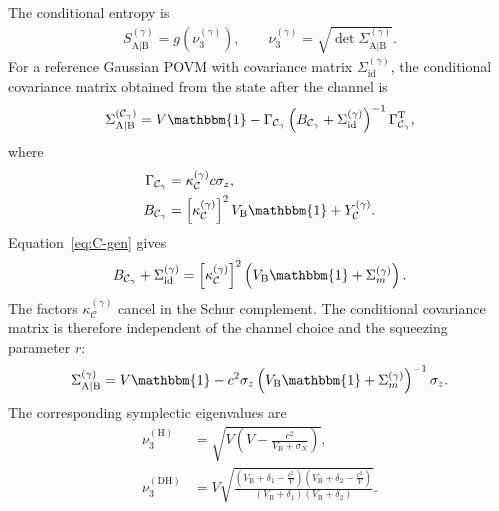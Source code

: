 \documentclass[%
final, 
superscriptaddress,
 amsmath,amssymb,amsfonts,
 aps,
 pra,
 longbibliography,
]{revtex4-2}
\newcommand{\ind}[1]{\mathrm{#1}}
\begin{document}
The conditional entropy is
\begin{align}
  \label{eq:S_A1B-gamma}
  S_{\ind{A|B}}^{(\gamma)}
  =
  g(\nu_3^{(\gamma)}),
  \qquad
  \nu_3^{(\gamma)}
  =
  \sqrt{\det\Sigma_{\ind{A|B}}^{(\gamma)}}.
\end{align}
For a reference Gaussian POVM with covariance matrix
$\Sigma_{\ind{id}}^{(\gamma)}$, the conditional covariance matrix obtained from the state after the channel is
\begin{align}
  \Sigma_{\ind{A|B}}^{(\mathcal{C}_{\gamma})}
  =
  V\mathbbm{1}
  -
  \Gamma_{\mathcal{C}_{\gamma}}
  \left(
    B_{\mathcal{C}_{\gamma}}
    +
    \Sigma_{\ind{id}}^{(\gamma)}
  \right)^{-1}
  \Gamma_{\mathcal{C}_{\gamma}}^{\ind{T}},
\end{align}
where
\begin{align}
  \Gamma_{\mathcal{C}_{\gamma}}
  &=
  \kappa_{\mathcal{C}}^{(\gamma)}
  c\sigma_z,
  \\
  B_{\mathcal{C}_{\gamma}}
  &=
  \left[
    \kappa_{\mathcal{C}}^{(\gamma)}
  \right]^2
  V_{\ind{B}}\mathbbm{1}
  +
  Y_{\mathcal{C}}^{(\gamma)}.
\end{align}
Equation~\eqref{eq:C-gen} gives
\begin{align}
  B_{\mathcal{C}_{\gamma}}
  +
  \Sigma_{\ind{id}}^{(\gamma)}
  =
  \left[
    \kappa_{\mathcal{C}}^{(\gamma)}
  \right]^2
  \left(
    V_{\ind{B}}\mathbbm{1}
    +
    \Sigma_m^{(\gamma)}
  \right).
\end{align}
The factors
$\kappa_{\mathcal{C}}^{(\gamma)}$
cancel in the Schur complement. The conditional covariance matrix is therefore independent of the channel choice and the squeezing parameter $r$:
\begin{align}
  \label{eq:serf-a|b}
  \Sigma_{\ind{A|B}}^{(\gamma)}
  =
  V\mathbbm{1}
  -
  c^2\sigma_z
  \left(
    V_{\ind{B}}\mathbbm{1}
    +
    \Sigma_m^{(\gamma)}
  \right)^{-1}
  \sigma_z.
\end{align}
The corresponding symplectic eigenvalues are
\begin{align}
  \label{eq:nu3-H}
  \nu_3^{(\ind{H})}
  &=
  \sqrt{
    V\left(
      V-\frac{c^2}{V_{\ind{B}}+\sigma_N}
    \right)
  },
  \\
  \label{eq:nu3-DH}
  \nu_3^{(\ind{DH})}
  &=
  V
  \sqrt{
    \frac{
      \left(
        V_{\ind{B}}+\delta_1-\frac{c^2}{V}
      \right)
      \left(
        V_{\ind{B}}+\delta_2-\frac{c^2}{V}
      \right)
    }{
      \left(V_{\ind{B}}+\delta_1\right)
      \left(V_{\ind{B}}+\delta_2\right)
    }
  }.
\end{align}
\end{document}
